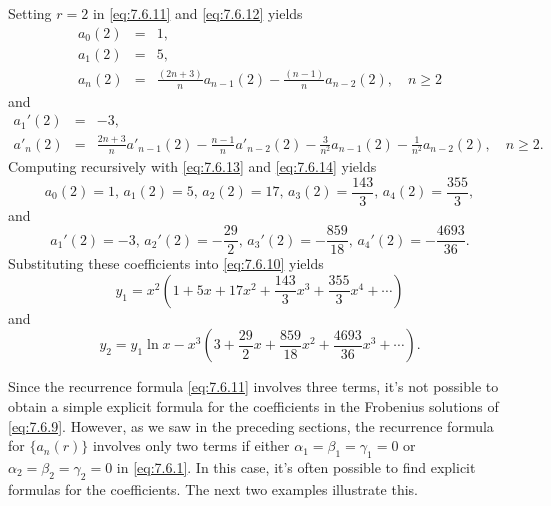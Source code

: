 \documentclass{ximera}
\begin{document}
\begin{example}
\begin{explanation}
Setting $r=2$ in \eqref{eq:7.6.11} and \eqref{eq:7.6.12} yields
\begin{equation} \label{eq:7.6.13}
\begin{array}{ccl}
a_0(2)&=&1,\\
a_1(2)&=&5,\\
a_n(2)&=&\frac{(2n+3)}{n}
a_{n-1}(2)-\frac{(n-1)}{n}a_{n-2}(2),\quad n\geq 2
\end{array}
\end{equation}
and
\begin{equation} \label{eq:7.6.14}
\begin{array}{ccl}
a_1'(2)&=&-3,\\
a'_n(2)&=&\frac{2n+3}{n}a'_{n-1}(2)-\frac{n-1}{n}a'_{n-2}(2)
-\frac{3}{n^2}a_{n-1}(2)-\frac{1}{n^2}a_{n-2}(2),\quad n\geq 2.
\end{array}
\end{equation}
Computing recursively with  \eqref{eq:7.6.13} and \eqref{eq:7.6.14}
yields
$$
a_0(2)=1,\,a_1(2)=5,\,a_2(2)=17,\,a_3(2)=\frac{143}{3},\,a_4(2)=\frac{355}{3},
$$
and
$$
a_1'(2)=-3,\,a_2'(2)=-\frac{29}{2},\,a_3'(2)=-\frac{859}{18},
\,a_4'(2)=-\frac{4693}{36}.
$$
Substituting these coefficients into \eqref{eq:7.6.10} yields
$$
y_1=x^2\left(1+5x+17x^2+\frac{143}{3}x^3
+\frac{355}{3}x^4+\cdots\right)
$$
and
$$
y_2=y_1 \ln x
-x^3\left(3+\frac{29}{2}x+\frac{859}{18}x^2+\frac{4693}{36}x^3
+\cdots\right).
$$
\end{explanation}
\end{example}

Since the recurrence formula \eqref{eq:7.6.11} involves three terms, it's
not possible to obtain a simple explicit formula for the coefficients
in the Frobenius solutions of \eqref{eq:7.6.9}. However, as we saw in the
preceding sections, the recurrence formula for $\{a_n(r)\}$ involves
only two terms if either $\alpha_1=\beta_1=\gamma_1=0$ or
$\alpha_2=\beta_2=\gamma_2=0$ in \eqref{eq:7.6.1}. In this case, it's
often
possible to find explicit formulas for the coefficients. The next two
examples illustrate this.
\end{document}
